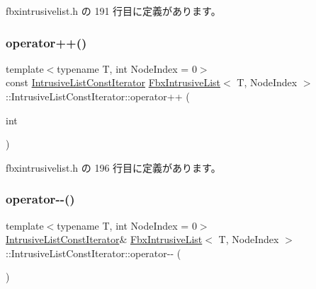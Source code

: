  fbxintrusivelist.\+h の 191 行目に定義があります。

\mbox{\label{class_fbx_intrusive_list_1_1_intrusive_list_const_iterator_a7bdf0ed9c35fae73e3998a09a209cf39}} 
\subsubsection{\texorpdfstring{operator++()}{operator++()}\hspace{0.1cm}{\footnotesize\ttfamily [2/2]}}
{\footnotesize\ttfamily template$<$typename T, int Node\+Index = 0$>$ \\
const \hyperlink{class_fbx_intrusive_list_1_1_intrusive_list_const_iterator}{Intrusive\+List\+Const\+Iterator} \hyperlink{class_fbx_intrusive_list}{Fbx\+Intrusive\+List}$<$ T, Node\+Index $>$\+::Intrusive\+List\+Const\+Iterator\+::operator++ (\begin{DoxyParamCaption}\item[{int}]{ }\end{DoxyParamCaption})\hspace{0.3cm}{\ttfamily [inline]}}



 fbxintrusivelist.\+h の 196 行目に定義があります。

\mbox{\label{class_fbx_intrusive_list_1_1_intrusive_list_const_iterator_a38f1d1a87aafa5d208c5dbf3158bb26d}} 
\subsubsection{\texorpdfstring{operator-\/-\/()}{operator--()}\hspace{0.1cm}{\footnotesize\ttfamily [1/2]}}
{\footnotesize\ttfamily template$<$typename T, int Node\+Index = 0$>$ \\
\hyperlink{class_fbx_intrusive_list_1_1_intrusive_list_const_iterator}{Intrusive\+List\+Const\+Iterator}\& \hyperlink{class_fbx_intrusive_list}{Fbx\+Intrusive\+List}$<$ T, Node\+Index $>$\+::Intrusive\+List\+Const\+Iterator\+::operator-\/-\/ (\begin{DoxyParamCaption}{ }\end{DoxyParamCaption})\hspace{0.3cm}{\ttfamily [inline]}}



